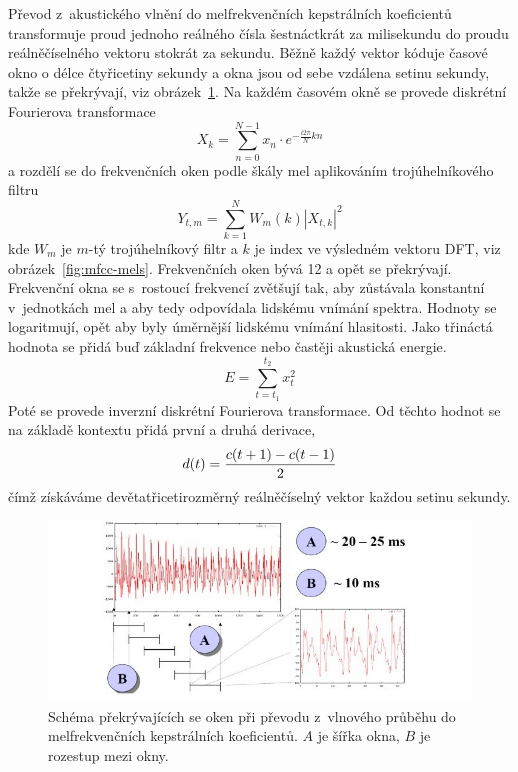 Převod z~akustického vlnění do melfrekvenčních kepstrálních koeficientů
transformuje proud jednoho reálného čísla šestnáctkrát za milisekundu do proudu
reálněčíselného vektoru stokrát za sekundu. Běžně každý vektor kóduje časové
okno o délce čtyřicetiny sekundy a okna jsou od sebe vzdálena setinu sekundy,
takže se překrývají, viz obrázek~\ref{fig:mfcc-windowing}. Na každém časovém
okně se provede diskrétní Fourierova transformace
\begin{equation}
X_k = \sum_{n=0}^{N-1} x_n \cdot e^{-\frac {i 2\pi}{N}kn}
\end{equation}
a rozdělí se do frekvenčních
oken podle škály
mel\cite{stevens1937scale} aplikováním trojúhelníkového filtru
\begin{equation}
Y_{t,m} = \sum_{k=1}^N W_m(k) |X_{t,k}|^2
\end{equation} kde $W_m$ je $m$-tý trojúhelníkový filtr a $k$ je index ve
výsledném vektoru DFT, viz
obrázek~\ref{fig:mfcc-mels}. Frekvenčních
oken bývá 12 a opět se překrývají. Frekvenční okna se s~rostoucí frekvencí
zvětšují tak, aby zůstávala konstantní v~jednotkách mel a aby tedy odpovídala
lidskému vnímání spektra. Hodnoty se logaritmují, opět aby byly
úměrnější lidskému vnímání hlasitosti. Jako třináctá hodnota se přidá buď
základní frekvence nebo častěji akustická energie.
\begin{equation}
E = \sum_{t=t_1}^{t_2}x^2_t
\end{equation}
Poté se provede inverzní
diskrétní Fourierova transformace. Od těchto hodnot se na základě kontextu přidá první a
druhá derivace,
\begin{equation}
d(t) = {{c(t+1) - c(t-1)}\over{2}}
\end{equation}
čímž získáváme devětatřicetirozměrný reálněčíselný vektor každou
setinu sekundy.

\begin{figure}[htpb]
\includegraphics[scale=1]{rc/mfcc-windowing.jpg}
\caption{
    Schéma překrývajících se oken při převodu z~vlnového průběhu do
    melfrekvenčních kepstrálních koeficientů. $A$ je šířka okna, $B$ je rozestup
    mezi okny.
}
\label{fig:mfcc-windowing}
\end{figure}

